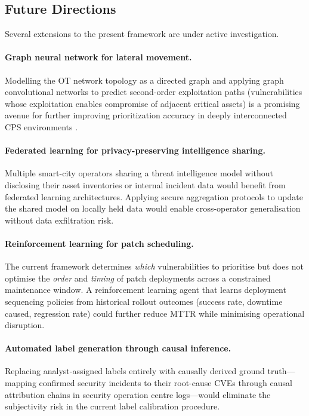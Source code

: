 \documentclass[review,12pt]{elsarticle}
\begin{document}
\subsection{Future Directions}

Several extensions to the present framework are under active investigation.

\paragraph{Graph neural network for lateral movement.} Modelling the OT network topology as a directed graph and applying graph convolutional networks to predict second-order exploitation paths (vulnerabilities whose exploitation enables compromise of adjacent critical assets) is a promising avenue for further improving prioritization accuracy in deeply interconnected CPS environments \citep{ramirez2024}.

\paragraph{Federated learning for privacy-preserving intelligence sharing.} Multiple smart-city operators sharing a threat intelligence model without disclosing their asset inventories or internal incident data would benefit from federated learning architectures. Applying secure aggregation protocols to update the shared model on locally held data would enable cross-operator generalisation without data exfiltration risk.

\paragraph{Reinforcement learning for patch scheduling.} The current framework determines \textit{which} vulnerabilities to prioritise but does not optimise the \textit{order} and \textit{timing} of patch deployments across a constrained maintenance window. A reinforcement learning agent that learns deployment sequencing policies from historical rollout outcomes (success rate, downtime caused, regression rate) could further reduce MTTR while minimising operational disruption.

\paragraph{Automated label generation through causal inference.} Replacing analyst-assigned labels entirely with causally derived ground truth---mapping confirmed security incidents to their root-cause CVEs through causal attribution chains in security operation centre logs---would eliminate the subjectivity risk in the current label calibration procedure.
\end{document}
